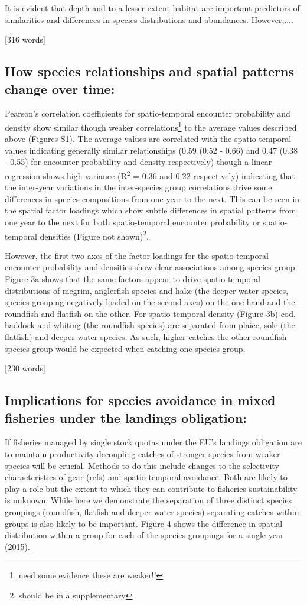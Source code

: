 \documentclass{nature}
\begin{document}
\begin{linenumbers}
It is evident that depth and to a lesser extent habitat are important
predictors of similarities and differences in species distributions and
abundances. However,....

[316 words]

\subsection{How species relationships and spatial patterns change over time:}
Pearson's correlation coefficients for spatio-temporal encounter probability
and density show similar though weaker correlations\footnote{need some evidence
	these are weaker!!} to the average values described above (Figures S1).
The average values are correlated with the spatio-temporal values indicating
generally similar relationships (0.59 (0.52 - 0.66) and 0.47 (0.38 - 0.55) for
encounter probability and density respectively) though a linear regression
shows high variance (R\textsuperscript{2} = 0.36 and 0.22 respectively)
indicating that the inter-year variations in the inter-species group
correlations drive some differences in species compositions from one-year to
the next.  This can be seen in the spatial factor loadings which show subtle
differences in spatial patterns from one year to the next for both
spatio-temporal encounter probability or spatio-temporal densities (Figure not
shown)\footnote{should be in a supplementary}. 

However, the first two axes of the factor loadings for the spatio-temporal
encounter probability and densities show clear associations among species
group. Figure 3a shows that the same factors appear to drive spatio-temporal
distributions of megrim, anglerfish species and hake (the deeper water species,
species grouping negatively loaded on the second axes) on the one hand and the
roundfish and flatfish on the other. For spatio-temporal density (Figure 3b)
cod, haddock and whiting (the roundfish species) are separated from plaice,
sole (the flatfish) and deeper water species. As such, higher catches the other
roundfish species group would be expected when catching one species group.

[230 words]

\subsection{Implications for species avoidance in mixed fisheries under the
	landings obligation:}
If fisheries managed by single stock quotas under the EU's landings obligation
are to maintain productivity decoupling catches of stronger species from weaker
species will be crucial.  Methods to do this include changes to the selectivity
characteristics of gear (refs) and spatio-temporal avoidance. Both are likely
to play a role but the extent to which they can contribute to fisheries
sustainability is unknown. While here we demonstrate the separation of three
distinct species groupings (roundfish, flatfish and deeper water species)
separating catches within groups is also likely to be important. Figure 4 shows
the difference in spatial distribution within a group for each of the species
groupings for a single year (2015). 


\end{linenumbers}
\end{document}
